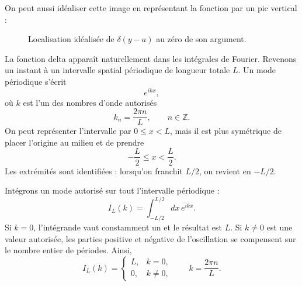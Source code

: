 On peut aussi idéaliser cette image en représentant la fonction par un pic vertical :
\begin{figure}[h]\centering
{}\caption{Localisation idéalisée de \(\delta(y-a)\) au zéro de son argument.}\end{figure}

La fonction delta apparaît naturellement dans les intégrales de Fourier. Revenons un instant à un intervalle spatial périodique de longueur totale \(L\). Un mode périodique s’écrit
\begin{equation}
e^{ikx},
\end{equation}
où \(k\) est l’un des nombres d’onde autorisés
\begin{equation}
k_n=\frac{2\pi n}{L},
\qquad n\in\mathbb Z.
\end{equation}
On peut représenter l’intervalle par \(0\leq x<L\), mais il est plus symétrique de placer l’origine au milieu et de prendre
\begin{equation}
-\frac L2\leq x<\frac L2.
\end{equation}
Les extrémités sont identifiées : lorsqu’on franchit \(L/2\), on revient en \(-L/2\).

Intégrons un mode autorisé sur tout l’intervalle périodique :
\begin{equation}
I_L(k)=\int_{-L/2}^{L/2}dx\,e^{ikx}.
\end{equation}
Si \(k=0\), l’intégrande vaut constamment un et le résultat est \(L\). Si \(k\neq0\) est une valeur autorisée, les parties positive et négative de l’oscillation se compensent sur le nombre entier de périodes. Ainsi,
\begin{equation}
I_L(k)=
\begin{cases}
L,&k=0,\\[4pt]
0,&k\neq0,
\end{cases}
\qquad
k=\frac{2\pi n}{L}.
\end{equation}

